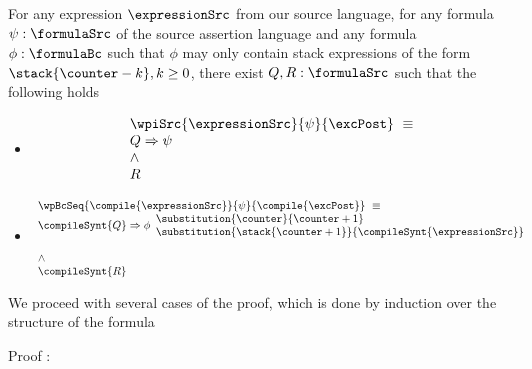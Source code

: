 \begin{exprValueOnStack} \label{exprValueOnStack}
For any expression $\expressionSrc$ from our source language, for any formula $\psi: \formulaSrc$  
of the source assertion language and any formula $\phi: \formulaBc$ such that $\phi$ may only 
contain stack expressions of the form     $\stack{\counter - k}, k \ge 0$, there 
exist $ Q, R : \formulaSrc$ such that the following holds


\begin{itemize}
\item   
$$ \begin{array}{l}
      \wpiSrc{  \expressionSrc }{ \psi }{ \excPost} \  \equiv \\ 
          Q \Rightarrow \psi \\
          \wedge \\ 
	  R  
  \end{array}$$


\item  
      $$ \begin{array}{l}
	    \wpBcSeq{ \compile{\expressionSrc} }{ \psi }{\compile{\excPost}} \  \equiv \\ 
              \compileSynt{Q} \Rightarrow \phi \begin{array}{l}
                                       \substitution{\counter}{\counter + 1}\\
			               \substitution{\stack{\counter +1}}{ \compileSynt{ \expressionSrc}}
                         \end{array} \\ \\
          \wedge \\ 
	  \compileSynt{R}
  \end{array}$$
\end{itemize}
\end{exprValueOnStack}

We proceed with several cases of the proof, which is done by induction over the structure of the formula

Proof : 
 


